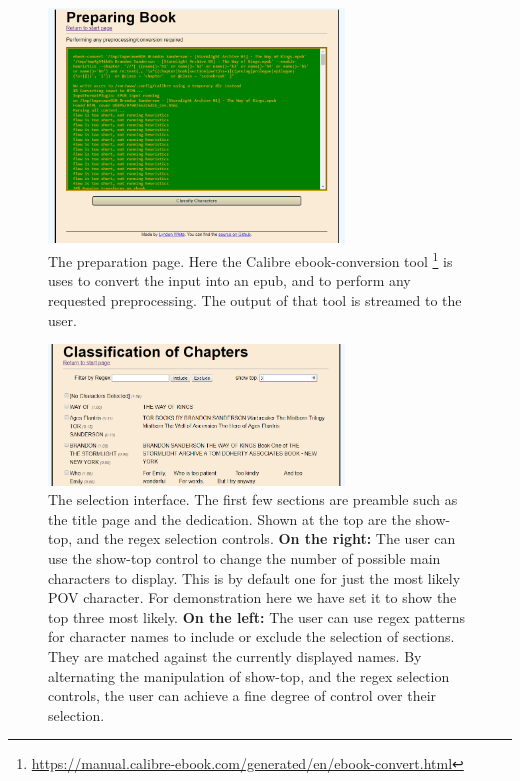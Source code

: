 \documentclass[11pt,a4paper]{article}
\begin{document}
\begin{figure}
	\centering
	\includegraphics[width=0.7\textwidth]{preprocessing}
	\caption{The preparation page.
		Here the Calibre ebook-conversion tool \footnote{\url{https://manual.calibre-ebook.com/generated/en/ebook-convert.html}} is uses to convert the input into an epub, and to perform any requested preprocessing.
		The output of that tool is streamed to the user.	
	}
	\label{fig:preprocess}
\end{figure}


\begin{figure}
	\centering
	\includegraphics[width=0.7\textwidth]{classstart}
	\caption{The selection interface. 
		The first few sections are preamble such as the title page and the dedication.
		Shown at the top are the show-top, and the regex selection controls.
		\textbf{On the right:}
		The user can use the show-top control to change the number of possible main characters to display.
		This is by default one for just the most likely POV character.
		For demonstration here we have set it to show the top three most likely.
		\textbf{On the left:}
		The user can use regex patterns for character names to include or exclude the selection of sections.
		They are matched against the currently displayed names.
		By alternating the manipulation of show-top, and the regex selection controls,
		the user can achieve a fine degree of control over their selection.
	}
	\label{fig:classstart}
\end{figure}
\end{document}

